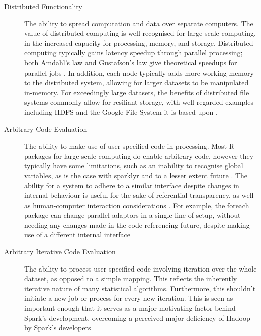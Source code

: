 \documentclass[a4paper,10pt]{article}
\begin{document}
\begin{description}
	\item[Distributed Functionality]
	      The ability to spread computation and data over separate
	      computers.
	      The value of distributed computing is well recognised for
	      large-scale computing, in the increased capacity for
	      processing, memory, and storage.
	      Distributed computing typically gains latency speedup through
	      parallel processing; both Amdahl's law and Gustafson's law give
	      theoretical speedups for parallel jobs \cite{amdahl1967law}
	      \cite{gustafson1988law}.
	      In addition, each node typically adds more working memory to
	      the distributed system, allowing for larger datasets to be
	      manipulated in-memory.
	      For exceedingly large datasets, the benefits of distributed
	      file systems commonly allow for resiliant storage, with
	      well-regarded examples including HDFS and the Google File
	      System it is based upon \cite{shvachko2010hadoop}
	      \cite{ghemawat2003google}.
	\item[Arbitrary Code Evaluation]
	      The ability to make use of user-specified code in processing.
	      Most R packages for large-scale computing do enable arbitrary
	      code, however they typically have some limitations, such as an
	      inability to recognise global variables, as is the case with
	      sparklyr and to a lesser extent future
	      \cite{sparklyr2020limitations} \cite{microsoft20}.
	      The ability for a system to adhere to a similar interface
	      despite changes in internal behaviour is useful for the sake of
	      referential transparency, as well as human-computer interaction
	      considerations \cite{sondergaard1990Rtda}
	      \cite{norman2013design}.
	      For example, the foreach package can change parallel adaptors in
		a single line of setup, without needing any changes made in the
		code referencing future, despite making use of a different internal
		interface \cite{weston19:_using}
	\item[Arbitrary Iterative Code Evaluation]
	      The ability to process user-specified code involving iteration
	      over the whole dataset, as opposed to a simple mapping.
	      This reflects the inherently iterative nature of many
	      statistical algorithms.
	      Furthermore, this shouldn't initiate a new job or process for
	      every new iteration.
	      This is seen as important enough that it serves as a major
		motivating factor behind Spark's development, overcoming a
		perceived major deficiency of Hadoop by Spark's developers

\end{description}
\end{document}
